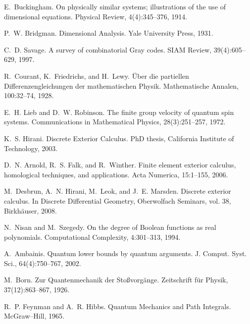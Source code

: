\documentclass[11pt,a4paper,twoside]{article}
\numberwithin{equation}{section}
\theoremstyle{customthm}
\theoremstyle{customdef}
\theoremstyle{customrem}
\begin{document}
\newpage

\begin{thebibliography}{99}

E.~Buckingham. On physically similar systems; illustrations of the use of dimensional equations. Physical Review, 4(4):345–376, 1914.

P.~W. Bridgman. Dimensional Analysis. Yale University Press, 1931.

C.~D. Savage. A survey of combinatorial Gray codes. SIAM Review, 39(4):605–629, 1997.

R.~Courant, K.~Friedrichs, and H.~Lewy. Über die partiellen Differenzengleichungen der mathematischen Physik. Mathematische Annalen, 100:32–74, 1928.

E.~H. Lieb and D.~W. Robinson. The finite group velocity of quantum spin systems. Communications in Mathematical Physics, 28(3):251–257, 1972.

K.~S. Hirani. Discrete Exterior Calculus. PhD thesis, California Institute of Technology, 2003.

D.~N. Arnold, R.~S. Falk, and R.~Winther. Finite element exterior calculus, homological techniques, and applications. Acta Numerica, 15:1–155, 2006.

M.~Desbrun, A.~N. Hirani, M.~Leok, and J.~E. Marsden. Discrete exterior calculus. In Discrete Differential Geometry, Oberwolfach Seminars, vol. 38, Birkhäuser, 2008.

N.~Nisan and M.~Szegedy. On the degree of Boolean functions as real polynomials. Computational Complexity, 4:301–313, 1994.

A.~Ambainis. Quantum lower bounds by quantum arguments. J. Comput. Syst. Sci., 64(4):750–767, 2002.

M.~Born. Zur Quantenmechanik der Stoßvorgänge. Zeitschrift für Physik, 37(12):863–867, 1926.

R.~P. Feynman and A.~R. Hibbs. Quantum Mechanics and Path Integrals. McGraw–Hill, 1965.


\end{thebibliography}
\end{document}
